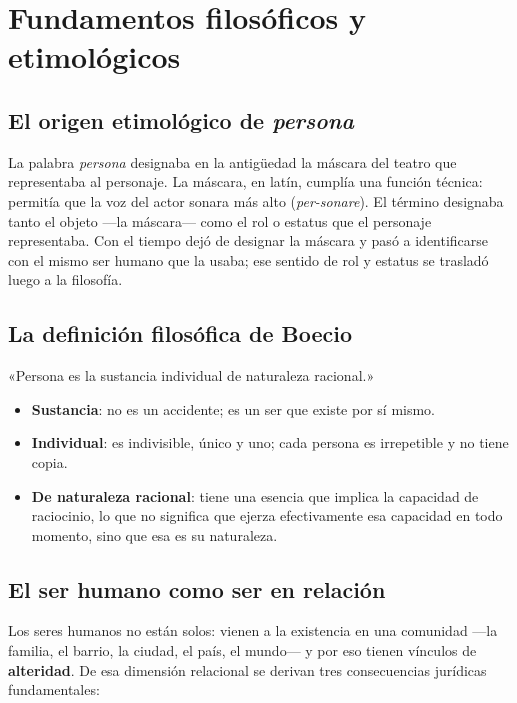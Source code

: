 \documentclass[12pt,oneside]{book}
\begin{document}
\section{Fundamentos filosóficos y etimológicos}

\subsection{El origen etimológico de \emph{persona}}

La palabra \emph{persona} designaba en la antigüedad la máscara del teatro que representaba al personaje. La máscara, en latín, cumplía una función técnica: permitía que la voz del actor sonara más alto (\emph{per-sonare}). El término designaba tanto el objeto ---la máscara--- como el rol o estatus que el personaje representaba. Con el tiempo dejó de designar la máscara y pasó a identificarse con el mismo ser humano que la usaba; ese sentido de rol y estatus se trasladó luego a la filosofía.

\subsection{La definición filosófica de Boecio}

\begin{definicion}
«Persona es la sustancia individual de naturaleza racional.»
\begin{itemize}
\item \textbf{Sustancia}: no es un accidente; es un ser que existe por sí mismo.
\item \textbf{Individual}: es indivisible, único y uno; cada persona es irrepetible y no tiene copia.
\item \textbf{De naturaleza racional}: tiene una esencia que implica la capacidad de raciocinio, lo que no significa que ejerza efectivamente esa capacidad en todo momento, sino que esa es su naturaleza.
\end{itemize}
\end{definicion}

\subsection{El ser humano como ser en relación}

Los seres humanos no están solos: vienen a la existencia en una comunidad ---la familia, el barrio, la ciudad, el país, el mundo--- y por eso tienen vínculos de \textbf{alteridad}. De esa dimensión relacional se derivan tres consecuencias jurídicas fundamentales:
\end{document}
